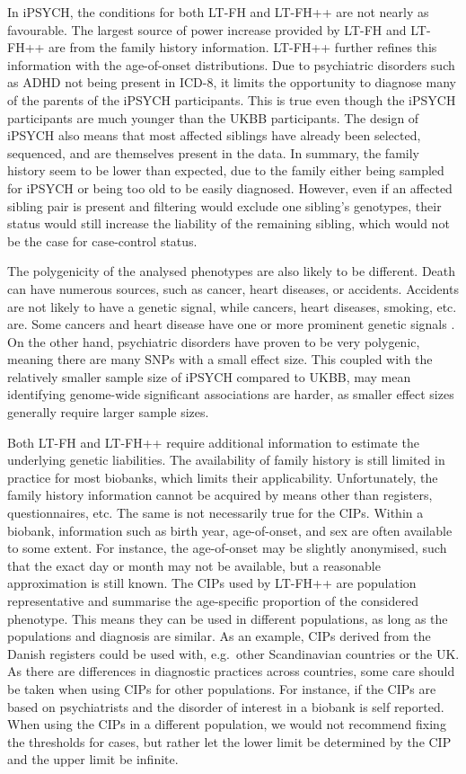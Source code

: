 In iPSYCH, the conditions for both LT-FH and LT-FH++ are not nearly as favourable. The largest source of power increase provided by LT-FH and LT-FH++ are from the family history information. LT-FH++ further refines this information with the age-of-onset distributions. Due to psychiatric disorders such as ADHD not being present in ICD-8, it limits the opportunity to diagnose many of the parents of the iPSYCH participants. This is true even though the iPSYCH participants are much younger than the UKBB participants. The design of iPSYCH also means that most affected siblings have already been selected, sequenced, and are themselves present in the data\cite{pedersen2018ipsych2012}. In summary, the family history seem to be lower than expected, due to the family either being sampled for iPSYCH or being too old to be easily diagnosed. However, even if an affected sibling pair is present and filtering would exclude one sibling's genotypes, their status would still increase the liability of the remaining sibling, which would not be the case for case-control status.

The polygenicity of the analysed phenotypes are also likely to be different. Death can have numerous sources, such as cancer, heart diseases, or accidents. Accidents are not likely to have a genetic signal, while cancers, heart diseases, smoking, etc. are. Some cancers and heart disease have one or more prominent genetic signals \cite{koyama2020population,marioni2018gwas}. On the other hand, psychiatric disorders have proven to be very polygenic, meaning there are many SNPs with a small effect size\cite{gandal2018shared}. This coupled with the relatively smaller sample size of iPSYCH compared to UKBB, may mean identifying genome-wide significant associations are harder, as smaller effect sizes generally require larger sample sizes.

Both LT-FH and LT-FH++ require additional information to estimate the underlying genetic liabilities. The availability of family history is still limited in practice for most biobanks, which limits their applicability. Unfortunately, the family history information cannot be acquired by means other than registers, questionnaires, etc. The same is not necessarily true for the CIPs. Within a biobank, information such as birth year, age-of-onset, and sex are often available to some extent. For instance, the age-of-onset may be slightly anonymised, such that the exact day or month may not be available, but a reasonable approximation is still known. The CIPs used by LT-FH++ are population representative and summarise the age-specific proportion of the considered phenotype. This means they can be used in different populations, as long as the populations and diagnosis are similar. As an example, CIPs derived from the Danish registers could be used with, e.g.\ other Scandinavian countries or the UK. As there are differences in diagnostic practices across countries, some care should be taken when using CIPs for other populations. For instance, if the CIPs are based on psychiatrists and the disorder of interest in a biobank is self reported. When using the CIPs in a different population, we would not recommend fixing the thresholds for cases, but rather let the lower limit be determined by the CIP and the upper limit be infinite. 